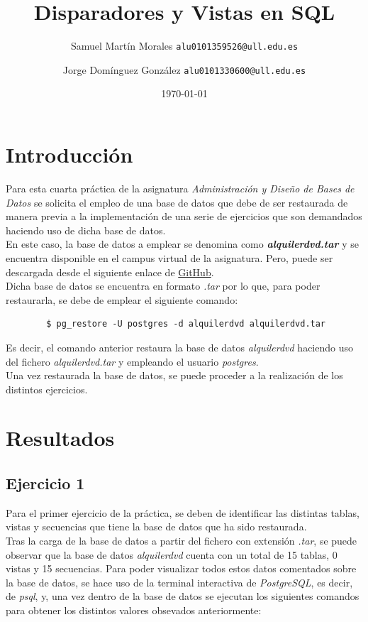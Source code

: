 \documentclass[10pt]{report}
\begin{document}
	
	
	\title{Disparadores y Vistas en SQL}
	\author{Samuel Martín Morales \texttt{alu0101359526@ull.edu.es} \and Jorge Domínguez González \texttt{alu0101330600@ull.edu.es}}
	\date{\today}
	
	\maketitle
	
	\tableofcontents
	
	\chapter{Introducción}
  Para esta cuarta práctica de la asignatura \emph{Administración y Diseño de Bases de Datos} se solicita el empleo de una base de datos que debe de ser restaurada de manera previa a la implementación de una serie de ejercicios que son demandados haciendo uso de dicha base de datos.
\\
	En este caso, la base de datos a emplear se denomina como \emph{\textbf{alquilerdvd.tar}} y se encuentra disponible en el campus virtual de la asignatura. Pero, puede ser descargada desde el siguiente enlace de \href{https://github.com/Samuelmm15/PostgreSQL-Rent/blob/main/AlquilerPractica.tar}{GitHub}.
\\
	Dicha base de datos se encuentra en formato \emph{.tar} por lo que, para poder restaurarla, se debe de emplear el siguiente comando:

	\begin{verbatim}
		$ pg_restore -U postgres -d alquilerdvd alquilerdvd.tar
	\end{verbatim}

	Es decir, el comando anterior restaura la base de datos \emph{alquilerdvd} haciendo uso del fichero \emph{alquilerdvd.tar} y empleando el usuario \emph{postgres}.
\\
	Una vez restaurada la base de datos, se puede proceder a la realización de los distintos ejercicios.
\\
	\chapter{Resultados}
	\section{Ejercicio 1}
	Para el primer ejercicio de la práctica, se deben de identificar las distintas tablas, vistas y secuencias que tiene la base de datos que ha sido restaurada.
\\
	Tras la carga de la base de datos a partir del fichero con extensión \emph{.tar}, se puede observar que la base de datos \emph{alquilerdvd} cuenta con un total de 15 tablas, 0 vistas y 15 secuencias. Para poder visualizar todos estos datos comentados sobre la base de datos, se hace uso de la terminal interactiva de \emph{PostgreSQL}, es decir, de \emph{psql}, y, una vez dentro de la base de datos se ejecutan los siguientes comandos para obtener los distintos valores obsevados anteriormente:
\end{document}

